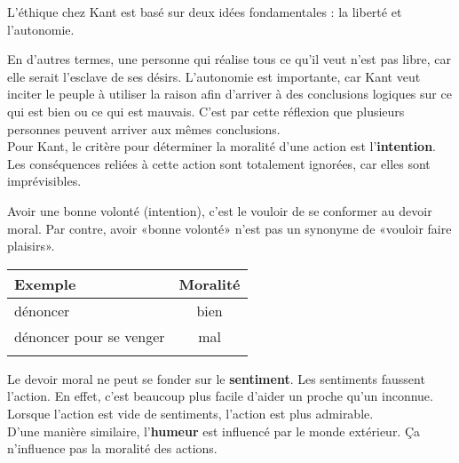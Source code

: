 \documentclass[11pt]{article}
\begin{document}
L'éthique chez Kant est basé sur deux idées fondamentales : la liberté et l'autonomie.


En d'autres termes, une personne qui réalise tous ce qu'il veut n'est pas libre, car elle serait l'esclave de ses désirs. L'autonomie est importante, car Kant veut inciter le peuple à utiliser la raison afin d'arriver à des conclusions logiques sur ce qui est bien ou ce qui est mauvais. C'est par cette réflexion que plusieurs personnes peuvent arriver aux mêmes conclusions.\\

Pour Kant, le critère pour déterminer la moralité d'une action est l'\textbf{intention}. Les conséquences reliées à cette action sont totalement ignorées, car elles sont imprévisibles.


Avoir une bonne volonté (intention), c'est le vouloir de se conformer au devoir moral. Par contre, avoir «bonne volonté» n'est pas un synonyme de «vouloir faire plaisirs». \\

\begin{center}
\begin{tabular}{@{}lc@{}}
\hline
  \textbf{Exemple}
& \textbf{Moralité}\\
\hline
  dénoncer
& bien\\
  dénoncer pour se venger
& mal\\
\hline\\
\end{tabular}
\end{center}

Le devoir moral ne peut se fonder sur le \textbf{sentiment}. Les sentiments faussent l'action. En effet, c'est beaucoup plus facile d'aider un proche qu'un inconnue. Lorsque l'action est vide de sentiments, l'action est plus admirable.\\

D'une manière similaire, l'\textbf{humeur} est influencé par le monde extérieur. Ça n'influence pas la moralité des actions.\\
\end{document}
